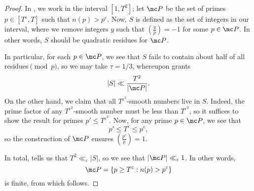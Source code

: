 \documentclass[../notes.tex]{subfiles}
\begin{document}
\begin{proof}
	In , we work in the interval $\left[1,T^2\right]$; let $\mc P$ be the set of primes $p\in\left[T^\varepsilon,T\right]$ such that $n(p)>p^\varepsilon$. Now, $S$ is defined as the set of integers in our interval, where we remove integers $y$ such that $\left(\frac yp\right)=-1$ for some $p\in\mc P$. In other words, $S$ should be quadratic residues for $\mc P$.

	In particular, for each $p\in\mc P$, we see that $S$ fails to contain about half of all residues$\pmod p$, so we may take $\tau=1/3$, whereupon  grants
	\[|S|\ll\frac{T^2}{|\mc P|}.\]
	On the other hand, we claim that all $T^{\varepsilon^2}$-smooth numbers live in $S$. Indeed, the prime factor of any $T^{\varepsilon^2}$-smooth number must be less than $T^{\varepsilon^2}$, so it suffices to show the result for primes $p'\le T^{\varepsilon^2}$. Now, for any prime $p\in\mc P$, we see that
	\[p'\le T^\varepsilon\le p^\varepsilon,\]
	so the construction of $\mc P$ ensures $\left(\frac{p'}p\right)=1$.

	In total,  tells us that $T^2\ll_\varepsilon|S|$, so we see that $|\mc P|\ll_\varepsilon1$. In other words,
	\[\mc P=\left\{p\ge T^\varepsilon:n(p)>p^\varepsilon\right\}\]
	is finite, from which  follows.
\end{proof}
\end{document}
